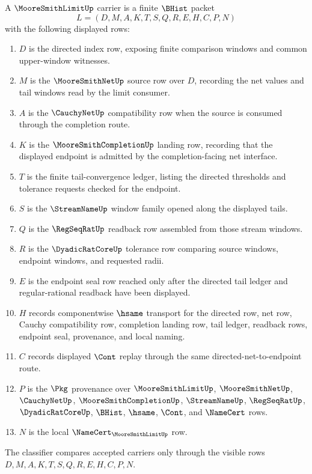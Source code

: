 \begin{definition}
\label{def:moore-smith-limit-carrier}
A $\MooreSmithLimitUp$ carrier is a finite $\BHist$ packet
$$
L=(D,M,A,K,T,S,Q,R,E,H,C,P,N)
$$
with the following displayed rows:
\begin{enumerate}
\item $D$ is the directed index row, exposing finite comparison windows and common upper-window witnesses.
\item $M$ is the $\MooreSmithNetUp$ source row over $D$, recording the net values and tail windows read by the limit consumer.
\item $A$ is the $\CauchyNetUp$ compatibility row when the source is consumed through the completion route.
\item $K$ is the $\MooreSmithCompletionUp$ landing row, recording that the displayed endpoint is admitted by the completion-facing net interface.
\item $T$ is the finite tail-convergence ledger, listing the directed thresholds and tolerance requests checked for the endpoint.
\item $S$ is the $\StreamNameUp$ window family opened along the displayed tails.
\item $Q$ is the $\RegSeqRatUp$ readback row assembled from those stream windows.
\item $R$ is the $\DyadicRatCoreUp$ tolerance row comparing source windows, endpoint windows, and requested radii.
\item $E$ is the endpoint seal row reached only after the directed tail ledger and regular-rational readback have been displayed.
\item $H$ records componentwise $\hsame$ transport for the directed row, net row, Cauchy compatibility row, completion landing row, tail ledger, readback rows, endpoint seal, provenance, and local naming.
\item $C$ records displayed $\Cont$ replay through the same directed-net-to-endpoint route.
\item $P$ is the $\Pkg$ provenance over $\MooreSmithLimitUp$, $\MooreSmithNetUp$, $\CauchyNetUp$, $\MooreSmithCompletionUp$, $\StreamNameUp$, $\RegSeqRatUp$, $\DyadicRatCoreUp$, $\BHist$, $\hsame$, $\Cont$, and $\NameCert$ rows.
\item $N$ is the local $\NameCert_{\MooreSmithLimitUp}$ row.
\end{enumerate}
The classifier compares accepted carriers only through the visible rows $D,M,A,K,T,S,Q,R,E,H,C,P,N$.
\end{definition}

